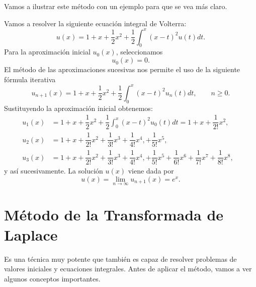 Vamos a ilustrar este método con un ejemplo para que se vea más claro.
\begin{ejemplo}
	Vamos a resolver la siguiente ecuación integral de Volterra:
	\begin{equation}
		u(x) = 1 + x + \dfrac{1}{2}x^2 + \dfrac{1}{2}\int_{0}^{x}(x-t)^2u(t)dt.
	\end{equation}
	Para la aproximación inicial $u_0(x)$, seleccionamos
	\begin{equation}
		u_0(x) = 0.
	\end{equation}
	El método de las aproximaciones sucesivas nos permite el uso de la siguiente fórmula iterativa
	\begin{equation}
		u_{n+1}(x) = 1 + x + \dfrac{1}{2}x^2 + \dfrac{1}{2}\int_{0}^{x}(x-t)^2u_n(t)dt, \qquad n \geqslant 0.
	\end{equation}
	Sustituyendo la aproximación inicial obtenemos:
	\begin{align}
		u_1(x) &= 1 + x + \dfrac{1}{2}x^2 + \dfrac{1}{2}\int_{0}^{x}(x-t)^2u_0(t)dt = 1 + x + \dfrac{1}{2!}x^2,   & \\
		u_2(x) &= 1 + x + \dfrac{1}{2!}x^2 + \dfrac{1}{3!}x^3 + \dfrac{1}{4!}x^4, + \dfrac{1}{5!}x^5,   & \\
		u_3(x) &= 1 + x + \dfrac{1}{2!}x^2 + \dfrac{1}{3!}x^3 + \dfrac{1}{4!}x^4, + \dfrac{1}{5!}x^5 + \dfrac{1}{6!}x^6 + \dfrac{1}{7!}x^7 + \dfrac{1}{8!}x^8,     &
	\end{align}
	y así sucesivamente. La solución $u(x)$ viene dada por
	\begin{equation}
		u(x) = \lim_{n \rightarrow \infty} u_{n+1}(x) = e^x.
	\end{equation}
\end{ejemplo}

\section{Método de la Transformada de Laplace}
Es una técnica muy potente que también es capaz de resolver problemas de valores iniciales y ecuaciones integrales. Antes de aplicar el método, vamos a ver algunos conceptos importantes.

